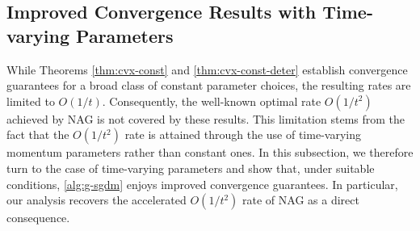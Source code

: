 \documentclass[10pt]{article}
\numberwithin{equation}{section}
\theoremstyle{definition}
\begin{document}
\subsection{Improved Convergence Results with Time-varying Parameters}
While Theorems \ref{thm:cvx-const} and \ref{thm:cvx-const-deter} establish convergence guarantees for a broad class of constant parameter choices, the resulting rates are limited to $O(1/t)$. Consequently, the well-known optimal rate $O(1/t^2)$ achieved by NAG is not covered by these results. This limitation stems from the fact that the $O(1/t^2)$ rate is attained through the use of time-varying momentum parameters rather than constant ones.
In this subsection, we therefore turn to the case of time-varying parameters and show that, under suitable conditions, \eqref{alg:g-sgdm} enjoys improved convergence guarantees. In particular, our analysis recovers the accelerated $O(1/t^2)$ rate of NAG as a direct consequence.
\end{document}
